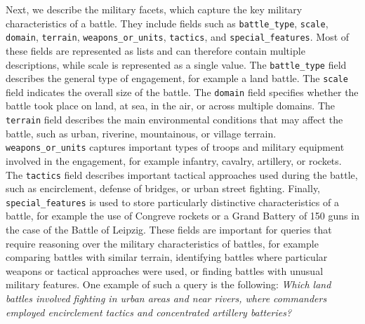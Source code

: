 Next, we describe the military facets, which capture the key military characteristics of a battle. They include fields such as \texttt{battle\_type}, \texttt{scale}, \texttt{domain}, \texttt{terrain}, \texttt{weapons\_or\_units}, \texttt{tactics}, and \texttt{special\_features}. Most of these fields are represented as lists and can therefore contain multiple descriptions, while scale is represented as a single value. The \texttt{battle\_type} field describes the general type of engagement, for example a land battle. The \texttt{scale} field indicates the overall size of the battle. The \texttt{domain} field specifies whether the battle took place on land, at sea, in the air, or across multiple domains. The \texttt{terrain} field describes the main environmental conditions that may affect the battle, such as urban, riverine, mountainous, or village terrain. \texttt{weapons\_or\_units} captures important types of troops and military equipment involved in the engagement, for example infantry, cavalry, artillery, or rockets. The \texttt{tactics} field describes important tactical approaches used during the battle, such as encirclement, defense of bridges, or urban street fighting. Finally, \texttt{special\_features} is used to store particularly distinctive characteristics of a battle, for example the use of Congreve rockets or a Grand Battery of 150 guns in the case of the Battle of Leipzig. These fields are important for queries that require reasoning over the military characteristics of battles, for example comparing battles with similar terrain, identifying battles where particular weapons or tactical approaches were used, or finding battles with unusual military features. One example of such a query is the following: \textit{Which land battles involved fighting in urban areas and near rivers, where commanders employed encirclement tactics and concentrated artillery batteries?}

